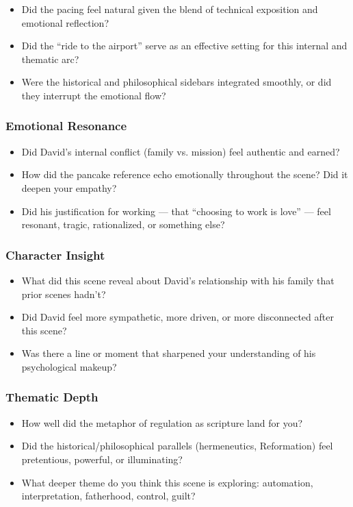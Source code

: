 \begin{itemize}
  \item Did the pacing feel natural given the blend of technical exposition and emotional reflection?
  \item Did the “ride to the airport” serve as an effective setting for this internal and thematic arc?
  \item Were the historical and philosophical sidebars integrated smoothly, or did they interrupt the emotional flow?
\end{itemize}

\subsubsection{Emotional Resonance}

\begin{itemize}
  \item Did David’s internal conflict (family vs. mission) feel authentic and earned?
  \item How did the pancake reference echo emotionally throughout the scene? Did it deepen your empathy?
  \item Did his justification for working — that “choosing to work is love” — feel resonant, tragic, rationalized, or something else?
\end{itemize}

\subsubsection{Character Insight}

\begin{itemize}
  \item What did this scene reveal about David’s relationship with his family that prior scenes hadn’t?
  \item Did David feel more sympathetic, more driven, or more disconnected after this scene?
  \item Was there a line or moment that sharpened your understanding of his psychological makeup?
\end{itemize}

\subsubsection{Thematic Depth}

\begin{itemize}
  \item How well did the metaphor of regulation as scripture land for you?
  \item Did the historical/philosophical parallels (hermeneutics, Reformation) feel pretentious, powerful, or illuminating?
  \item What deeper theme do you think this scene is exploring: automation, interpretation, fatherhood, control, guilt?
\end{itemize}

